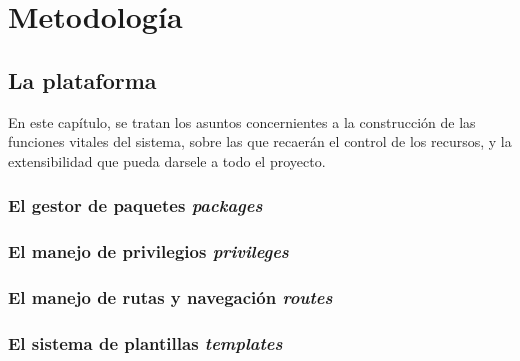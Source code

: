 \chapter{Metodología}

\section{La plataforma}

En este capítulo, se tratan los asuntos concernientes a la construcción de las funciones vitales del sistema, sobre las que
recaerán el control de los recursos, y la extensibilidad que pueda darsele a todo el proyecto.

\subsection{El gestor de paquetes \emph{packages}}


\subsection{El manejo de privilegios \emph{privileges}}
\subsection{El manejo de rutas y navegación \emph{routes}}

\subsection{El sistema de plantillas \emph{templates}}



